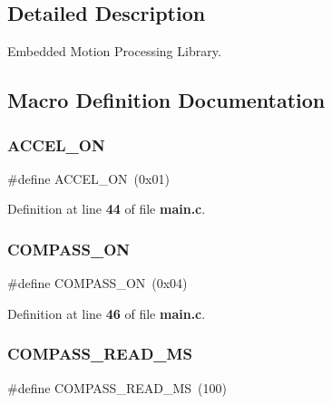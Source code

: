 \subsection{Detailed Description}
Embedded Motion Processing Library. 



\subsection{Macro Definition Documentation}
\mbox{\label{group__eMPL_ga96e2dc57b8fe509f98cbbb52811717c3}} 
\subsubsection{A\+C\+C\+E\+L\+\_\+\+ON}
{\footnotesize\ttfamily \#define A\+C\+C\+E\+L\+\_\+\+ON~(0x01)}



Definition at line \textbf{ 44} of file \textbf{ main.\+c}.

\mbox{\label{group__eMPL_gac4b29ad9d2af05af504ca053f3c5d76d}} 
\subsubsection{C\+O\+M\+P\+A\+S\+S\+\_\+\+ON}
{\footnotesize\ttfamily \#define C\+O\+M\+P\+A\+S\+S\+\_\+\+ON~(0x04)}



Definition at line \textbf{ 46} of file \textbf{ main.\+c}.

\mbox{\label{group__eMPL_ga0718d456616de258f21190908610fdf6}} 
\subsubsection{C\+O\+M\+P\+A\+S\+S\+\_\+\+R\+E\+A\+D\+\_\+\+MS}
{\footnotesize\ttfamily \#define C\+O\+M\+P\+A\+S\+S\+\_\+\+R\+E\+A\+D\+\_\+\+MS~(100)}



